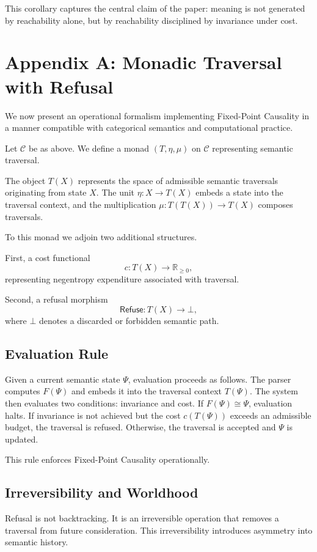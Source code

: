 \documentclass[12pt]{article}
\theoremstyle{remark}
\begin{document}
This corollary captures the central claim of the paper: meaning is not generated by reachability alone, but by reachability disciplined by invariance under cost.

\section{Appendix A: Monadic Traversal with Refusal}

We now present an operational formalism implementing Fixed-Point Causality in a manner compatible with categorical semantics and computational practice.

Let $\mathcal{C}$ be as above. We define a monad $(T,\eta,\mu)$ on $\mathcal{C}$ representing semantic traversal.

The object $T(X)$ represents the space of admissible semantic traversals originating from state $X$. The unit $\eta : X \to T(X)$ embeds a state into the traversal context, and the multiplication $\mu : T(T(X)) \to T(X)$ composes traversals.

To this monad we adjoin two additional structures.

First, a cost functional
\[
c : T(X) \to \mathbb{R}_{\ge 0},
\]
representing negentropy expenditure associated with traversal.

Second, a refusal morphism
\[
\mathsf{Refuse} : T(X) \to \bot,
\]
where $\bot$ denotes a discarded or forbidden semantic path.

\subsection{Evaluation Rule}

Given a current semantic state $\Psi$, evaluation proceeds as follows. The parser computes $F(\Psi)$ and embeds it into the traversal context $T(\Psi)$. The system then evaluates two conditions: invariance and cost. If $F(\Psi) \cong \Psi$, evaluation halts. If invariance is not achieved but the cost $c(T(\Psi))$ exceeds an admissible budget, the traversal is refused. Otherwise, the traversal is accepted and $\Psi$ is updated.

This rule enforces Fixed-Point Causality operationally.

\subsection{Irreversibility and Worldhood}

Refusal is not backtracking. It is an irreversible operation that removes a traversal from future consideration. This irreversibility introduces asymmetry into semantic history.
\end{document}
